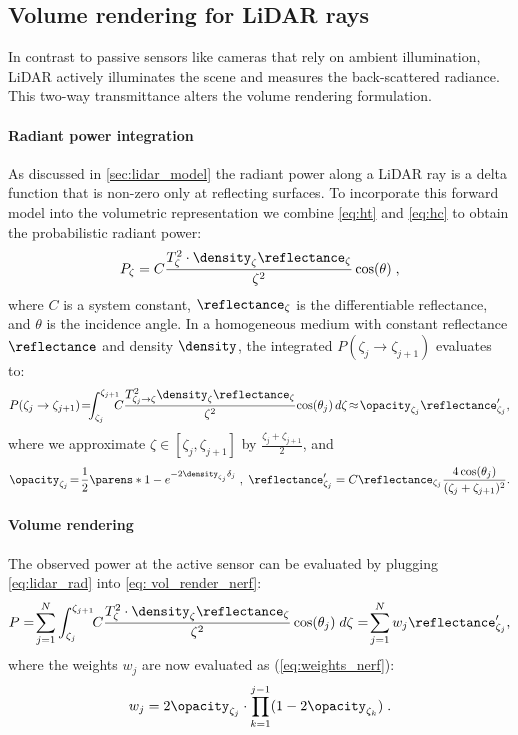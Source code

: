 \subsection{Volume rendering for LiDAR rays}
\label{sec:lidar_vr}
In contrast to passive sensors like cameras that rely on ambient illumination, LiDAR actively illuminates the scene and measures the back-scattered radiance. This two-way transmittance alters the volume rendering formulation. %

\paragraph{Radiant power integration}
As discussed in \cref{sec:lidar_model} 
the radiant power along a LiDAR ray is a delta function that is non-zero only at reflecting surfaces. To incorporate this forward model into the volumetric representation we combine \cref{eq:ht} and \cref{eq:hc} to obtain the 
probabilistic radiant power:
\begin{equation}
P_\zeta = C \frac{T^2_{\zeta} \cdot \density_\zeta  \reflectance_\zeta}{\zeta^2} \cos(\theta)\;,
\label{eq:radiance}
\end{equation}
where $C$ is a system constant, $\reflectance_\zeta$ is the differentiable reflectance, and $\theta$ is the incidence angle.
In a homogeneous medium with constant reflectance $\reflectance$ and density $\density$, the integrated $P(\zeta_j \rightarrow \zeta_{j+1})$ evaluates to:
\begin{equation}
     P(\zeta_j \rightarrow \zeta_{j+1}) 
     \!=\!\!\!\int_{\zeta_j}^{\zeta_{j+1}}\!\!\!\!C \frac{T^2_{\zeta_j \rightarrow \zeta} \density_\zeta \reflectance_\zeta}{\zeta^2}\!\cos(\theta_{j})\,d\zeta
     \!\approx\!\opacity_{\zeta_j} \reflectance_{\zeta_j}', 
\label{eq:lidar_rad}
\end{equation}
where we approximate $\zeta \in [\zeta_j, \zeta_{j+1}]$ by $\frac{\zeta_j + \zeta_{j+1}}{2}$, and 
\begin{equation}
    \opacity_{\zeta_j}\!=\!\frac{1}{2}\parens*{1- e^{-2\density_{\zeta_j}\delta_j}}\;,\; \reflectance_{\zeta_j}' = C \reflectance_{\zeta_j}\frac{4 \cos(\theta_j)}{(\zeta_j + \zeta_{j+1})^2}.
\end{equation}


\paragraph{Volume rendering}
The observed power at the active sensor can be evaluated by plugging \cref{eq:lidar_rad} into \cref{eq: vol_render_nerf}: 
\begin{equation}
      P
      =\!\sum_{j=1}^N \int_{\zeta_j}^{\zeta_{j+1}}\!\!C \frac{T^2_{\zeta} \cdot \density_\zeta \reflectance_\zeta}{\zeta^2} \cos(\theta_j) \; d\zeta
      =\!\sum_{j=1}^N w_j \reflectance_{\zeta_j}',
\end{equation}
where the weights $w_j$ are now evaluated as (\cf \cref{eq:weights_nerf}):
\begin{equation}
   w_j = 2 \opacity_{\zeta_j} \cdot\prod_{k=1}^{j-1}(1 - 2 \opacity_{\zeta_k})\;.
\label{eq:lidar_weights}
\end{equation}